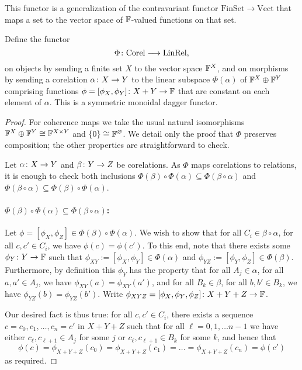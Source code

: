 This functor is a generalization of the
contravariant functor $\mathrm{FinSet} \to \mathrm{Vect}$ that maps a set to the
vector space of ${\mathbb F}$-valued functions on that set.

\begin{proposition}
  Define the functor 
  \[ 
    \Phi{\colon} \mathrm{Corel} \longrightarrow \mathrm{LinRel}, 
  \] 
  on objects by sending a finite set $X$ to the vector space ${\mathbb F}^X$, and on
  morphisms by sending a corelation $\alpha{\colon} X \to Y$ to the linear subspace
  $\Phi(\alpha)$ of ${\mathbb F}^X \oplus {\mathbb F}^Y$ comprising functions $\phi =
  [\phi_X,\phi_Y]{\colon} X+Y \to {\mathbb F}$ that are constant on each element of
  $\alpha$.  This is a symmetric monoidal dagger functor.
\end{proposition}

\begin{proof}
  For coherence maps we take the usual natural isomorphisms ${\mathbb F}^X \oplus {\mathbb F}^Y
  \cong {\mathbb F}^{X \times Y}$ and $\{0\} \cong {\mathbb F}^\varnothing$. We detail only the
  proof that $\Phi$ preserves composition; the other properties are
  straightforward to check.

  Let $\alpha{\colon} X \to Y$ and $\beta{\colon} Y \to Z$ be corelations. As $\Phi$
  maps corelations to relations, it is enough to check both inclusions
  $\Phi(\beta) \circ \Phi(\alpha) \subseteq \Phi(\beta\circ\alpha)$ and
  $\Phi(\beta\circ\alpha) \subseteq \Phi(\beta) \circ \Phi(\alpha)$. 

  \paragraph{$\Phi(\beta) \circ \Phi(\alpha) \subseteq \Phi(\beta\circ\alpha)$:}
  Let $\phi = [\phi_X,\phi_Z] \in \Phi(\beta) \circ \Phi(\alpha)$. We wish to show
  that for all $C_i \in \beta\circ\alpha$, for all $c,c' \in C_i$, we have
  $\phi(c) = \phi(c')$. To this end, note that there exists some $\phi_Y{\colon} Y \to {\mathbb F}$
  such that $\phi_{XY} := [\phi_X,\phi_Y] \in \Phi(\alpha)$ and $\phi_{YZ} :=
  [\phi_Y,\phi_Z] \in \Phi(\beta)$.  Furthermore, by definition this $\phi_Y$ has
  the property that for all $A_j \in \alpha$, for all $a,a' \in A_j$, we have
  $\phi_{XY}(a) = \phi_{XY}(a')$, and for all $B_k \in \beta$, for all $b,b' \in
  B_k$, we have $\phi_{YZ}(b) = \phi_{YZ}(b')$. Write $\phi_{XYZ} =
  [\phi_X,\phi_Y,\phi_Z]{\colon} X+Y+Z \to {\mathbb F}$.

  Our desired fact is thus true: for all $c,c' \in C_i$, there exists a sequence $c=c_0,
  c_1, \dots, c_n=c'$ in $X+Y+Z$ such that for all $\ell=0,1, \dots n-1$ we have
  either $c_\ell, c_{\ell+1} \in A_j$ for some $j$ or $c_\ell,c_{\ell+1} \in B_k$
  for some $k$, and hence that 
  \[
    \phi(c) = \phi_{X+Y+Z}(c_0)= \phi_{X+Y+Z}(c_1) = \dots = \phi_{X+Y+Z}(c_n) =
    \phi(c')
  \]
  as required.


\end{proof}
